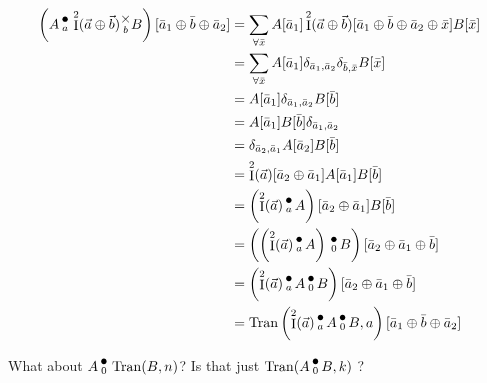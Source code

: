 \documentclass[12pt]{book}
\theoremstyle{plain}
\theoremstyle{definition}
\theoremstyle{ppart}
\theoremstyle{case}
\theoremstyle{solution}
\DeclareMathOperator{\Ident}{I}
\DeclareMathOperator{\Tran}{Tran}
\newcommand{\mmult}[1]{\text{\raisebox{1ex}{$\underset{#1}{\times}$}}}
\newcommand{\dmult}[1]{\text{\raisebox{1ex}{$\underset{#1}{\,\bullet\,}$}}}
\begin{document}
\begin{appendices}
\begin{align*}
\left( A \dmult{a} \Ident^2(\vec{a} \oplus \vec{b}) \mmult{b} B \right)[\bar{a}_1 \oplus \bar{b} \oplus \bar{a}_2]
  &=
  \sum_{\forall \bar{x}} A [\bar{a}_1] \Ident^2(\vec{a} \oplus \vec{b}) [\bar{a}_1 \oplus \bar{b} \oplus \bar{a}_2 \oplus \bar{x}] B[\bar{x}] \\
  &=
  \sum_{\forall \bar{x}} A [\bar{a}_1] \delta_{\bar{a}_1, \bar{a}_2} \delta_{\bar{b}, \bar{x}} B[\bar{x}] \\
  &=
  A [\bar{a}_1] \delta_{\bar{a}_1, \bar{a}_2} B[\bar{b}] \\
  &=
  A [\bar{a}_1] B[\bar{b}] \delta_{\bar{a}_1, \bar{a}_2} \\
  &=
  \delta_{\bar{a}_2, \bar{a}_1} A [\bar{a}_2] B[\bar{b}] \\
  &=
  \Ident^2(\vec{a})[\bar{a}_2 \oplus \bar{a}_1] A [\bar{a}_1] B[\bar{b}] \\
  &=
  \left(\Ident^2(\vec{a}) \dmult{a} A\right) [\bar{a}_2 \oplus \bar{a}_1]B[\bar{b}] \\
  &=
  \left(\left(\Ident^2(\vec{a}) \dmult{a} A\right) \dmult{0} B\right) [\bar{a}_2 \oplus \bar{a}_1 \oplus \bar{b}] \\
  &=
  \left(\Ident^2(\vec{a}) \dmult{a} A \dmult{0} B\right) [\bar{a}_2 \oplus \bar{a}_1 \oplus \bar{b}] \\
  &=
  \Tran\left(\Ident^2(\vec{a}) \dmult{a} A \dmult{0} B, a\right) [\bar{a}_1 \oplus \bar{b} \oplus \bar{a}_2]
\end{align*}

What about $A \dmult{0} \Tran(B, n)$? Is that just $\Tran(A \dmult{0} B, k)$ ?

\end{appendices}



\end{document}
